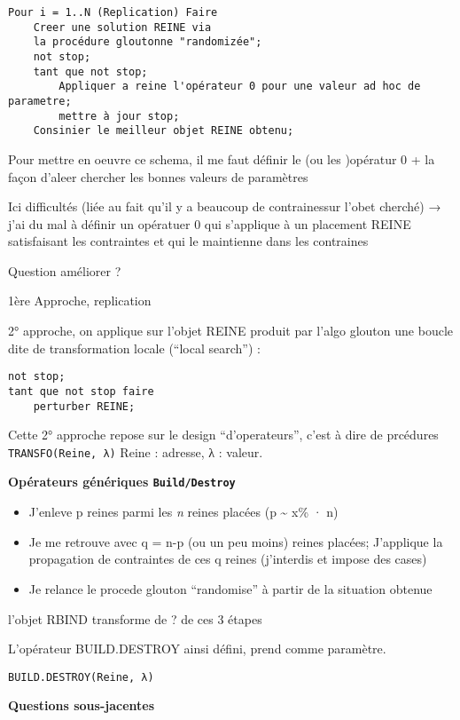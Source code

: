 \documentclass[]{article}
\begin{document}
\begin{verbatim}
Pour i = 1..N (Replication) Faire
    Creer une solution REINE via
    la procédure gloutonne "randomizée";
    not stop;
    tant que not stop;
        Appliquer a reine l'opérateur 0 pour une valeur ad hoc de parametre;
        mettre à jour stop;
    Consinier le meilleur objet REINE obtenu;
\end{verbatim}

Pour mettre en oeuvre ce schema, il me faut définir le (ou les )opératur
0 + la façon d'aleer chercher les bonnes valeurs de paramètres

Ici difficultés (liée au fait qu'il y a beaucoup de contrainessur l'obet
cherché) → j'ai du mal à définir un opératuer 0 qui s'applique à un
placement REINE satisfaisant les contraintes et qui le maintienne dans
les contraines

Question améliorer ?

1ère Approche, replication

2° approche, on applique sur l'objet REINE produit par l'algo glouton
une boucle dite de transformation locale (``local search'') :

\begin{verbatim}
not stop;
tant que not stop faire
    perturber REINE;
\end{verbatim}

Cette 2° approche repose sur le design ``d'operateurs'', c'est à dire de
prcédures \texttt{TRANSFO(Reine,\ λ)} Reine : adresse, λ : valeur.

\textbf{Opérateurs génériques \texttt{Build/Destroy}}

\begin{itemize}
\tightlist
\item
  J'enleve p reines parmi les \emph{n} reines placées (p
  \textasciitilde{} x\% · n)
\item
  Je me retrouve avec q = n-p (ou un peu moins) reines placées;
  J'applique la propagation de contraintes de ces q reines (j'interdis
  et impose des cases)
\item
  Je relance le procede glouton ``randomise'' à partir de la situation
  obtenue
\end{itemize}

l'objet RBIND transforme de ? de ces 3 étapes

L'opérateur BUILD.DESTROY ainsi défini, prend comme paramètre.

\texttt{BUILD.DESTROY(Reine,\ λ)}

\textbf{Questions sous-jacentes}
\end{document}
